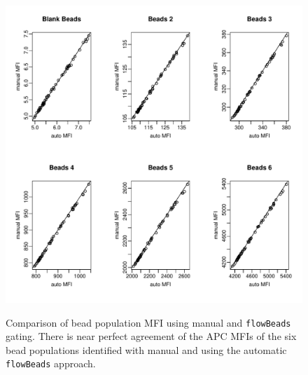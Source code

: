\begin{figure}
\begin{minipage}{.65\textwidth}
\includegraphics[width=\linewidth]{figures/manual-auto-mfi.pdf}
\end{minipage}
{ Comparison of bead population MFI using manual and \texttt{flowBeads} gating.  }
{ There is near perfect agreement of the APC MFIs of the six bead populations identified with manual and using the automatic \texttt{flowBeads} approach. }
\end{figure}

